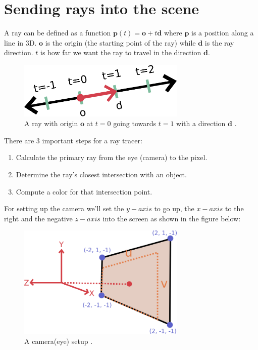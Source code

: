 \documentclass[11pt,a4paper]{article}
\begin{document}
	\section{Sending rays into the scene}
	A ray can be defined as a function $\boldsymbol{p}(t) = \boldsymbol{o} + t\boldsymbol{d}$ where $\boldsymbol{p}$ is a position along a line in 3D. $\boldsymbol{o}$ is the origin (the starting point of the ray) while $\boldsymbol{d}$ is the ray direction. $t$ is how far we want the ray to travel in the direction $\boldsymbol{d}$.\\
	\begin{figure}[H]
		\centering
		\includegraphics[width=8cm]{ray1.png}
		\caption{\centering A ray with origin $\boldsymbol{o}$ at $t=0$ going towards $t=1$ with a direction $\boldsymbol{d}$ \protect\cite{Shirley2020RTW1}.}
	\end{figure}
	\noindent
	There are 3 important steps for a ray tracer:
	\begin{enumerate}
		\item Calculate the primary ray from the eye (camera) to the pixel.
		\item Determine the ray's closest intersection with an object.
		\item Compute a color for that intersection point.
	\end{enumerate}

	\noindent
	For setting up the camera we'll set the $y-axis$ to go up, the $x-axis$ to the right and the negative $z-axis$ into the screen as shown in the figure below:
	\begin{figure}[H]
		\centering
		\includegraphics[width=8cm]{camera.png}
		\caption{\centering A camera(eye) setup \protect\cite{Shirley2020RTW1}.}
	\end{figure}
\end{document}
